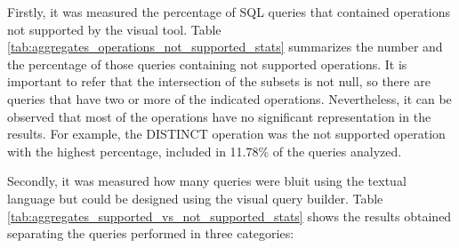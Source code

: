 Firstly, it was measured the percentage of \gls{SQL} queries that contained operations not supported by the visual tool. Table \ref{tab:aggregates_operations_not_supported_stats} summarizes the number and the percentage of those queries containing not supported operations. It is important to refer that the intersection of the subsets is not null, so there are queries that have two or more of the indicated operations. Nevertheless, it can be observed that most of the operations have no significant representation in the results. For example, the DISTINCT operation was the not supported operation with the highest percentage, included in 11.78\% of the queries analyzed.


\begin{table}[tb]
	\caption{Queries that contain operations not supported by Aggregates}
	\label{tab:aggregates_operations_not_supported_stats}
\centering
{}
\end{table}

Secondly, it was measured how many queries were bluit using the textual language but could be designed using the visual query builder. Table \ref{tab:aggregates_supported_vs_not_supported_stats} shows the results obtained separating the queries performed in three categories:

